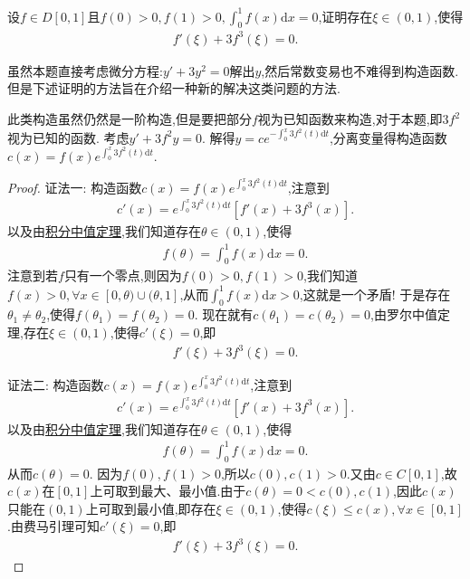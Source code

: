 \documentclass[../../main.tex]{subfiles}
\begin{document}
\begin{example}
设\(f\in D[0,1]\)且\(f(0)>0,f(1)>0,\int_{0}^{1} f(x)\mathrm{d}x = 0\),证明存在\(\xi\in(0,1)\),使得
\begin{align*}
f'(\xi)+3f^{3}(\xi)=0.
\end{align*}
\end{example}
\begin{remark}
虽然本题直接考虑微分方程:$y'+3y^2=0$解出$y$,然后常数变易也不难得到构造函数.但是下述证明的方法旨在介绍一种新的解决这类问题的方法.
\end{remark}
\begin{note}
此类构造虽然仍然是一阶构造,但是要把部分\(f\)视为已知函数来构造,对于本题,即\(3f^{2}\)视为已知的函数. 考虑\(y'+3f^{2}y = 0\). 解得\(y = ce^{-\int_{0}^{x} 3f^{2}(t)\mathrm{d}t}\),分离变量得构造函数\(c(x)=f(x)e^{\int_{0}^{x} 3f^{2}(t)\mathrm{d}t}\).
\end{note}
\begin{proof}
{\color{blue}证法一:}
构造函数\(c(x)=f(x)e^{\int_{0}^{x} 3f^{2}(t)\mathrm{d}t}\),注意到
\begin{align*}
c'(x)=e^{\int_{0}^{x} 3f^{2}(t)\mathrm{d}t}[f'(x)+3f^{3}(x)].
\end{align*}
以及由\hyperref[theorem:积分中值定理]{积分中值定理},我们知道存在\(\theta\in(0,1)\),使得
\begin{align*}
f(\theta)=\int_{0}^{1} f(x)\mathrm{d}x = 0.
\end{align*}
注意到若\(f\)只有一个零点,则因为\(f(0)>0,f(1)>0\),我们知道\(f(x)>0,\forall x\in[0,\theta)\cup(\theta,1]\),从而\(\int_{0}^{1} f(x)\mathrm{d}x>0\),这就是一个矛盾!
于是存在\(\theta_1\neq\theta_2\),使得\(f(\theta_1)=f(\theta_2)=0\). 现在就有\(c(\theta_1)=c(\theta_2)=0\),由罗尔中值定理,存在\(\xi\in(0,1)\),使得\(c'(\xi)=0\),即
\begin{align*}
f'(\xi)+3f^{3}(\xi)=0.
\end{align*}

{\color{blue}证法二:}
构造函数\(c(x)=f(x)e^{\int_{0}^{x} 3f^{2}(t)\mathrm{d}t}\),注意到
\begin{align*}
c'(x)=e^{\int_{0}^{x} 3f^{2}(t)\mathrm{d}t}[f'(x)+3f^{3}(x)].
\end{align*}
以及由\hyperref[theorem:积分中值定理]{积分中值定理},我们知道存在\(\theta\in(0,1)\),使得
\begin{align*}
f(\theta)=\int_{0}^{1} f(x)\mathrm{d}x = 0.
\end{align*}
从而$c(\theta)=0$.
因为$f(0),f(1)>0$,所以$c(0),c(1)>0$.又由$c\in C[0,1]$,故$c(x)$在$[0,1]$上可取到最大、最小值.由于$c(\theta)=0<c(0),c(1)$,因此$c(x)$只能在$(0,1)$上可取到最小值,即存在\(\xi\in(0,1)\),使得$c(\xi)\leqslant  c(x),\forall x\in[0,1]$.由费马引理可知\(c'(\xi)=0\),即
\begin{align*}
f'(\xi)+3f^{3}(\xi)=0.
\end{align*}
\end{proof}
\end{document}
